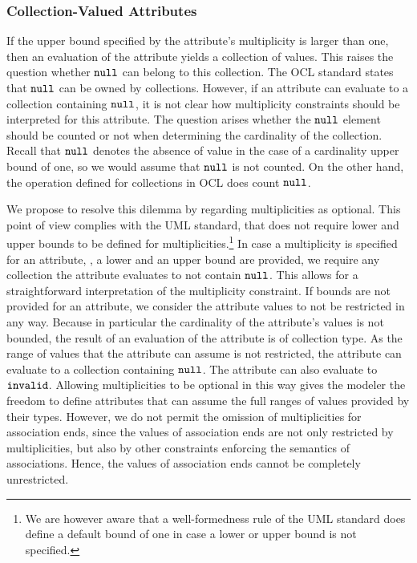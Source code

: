 \subsubsection{Collection-Valued Attributes}\label{sec:collection-valued-properties}
If the upper bound specified by the attribute's multiplicity is larger than one,
then an evaluation of the attribute yields a collection of values.  This raises
the question whether $\mathtt{null}$ can belong to this collection. The OCL
standard states that $\mathtt{null}$ can be owned by collections. However, if
an attribute can evaluate to a collection containing $\mathtt{null}$, it is not
clear how multiplicity constraints should be interpreted for this attribute. The
question arises whether the $\mathtt{null}$ element should be counted or not
when determining the cardinality of the collection. Recall that $\mathtt{null}$
denotes the absence of value in the case of a cardinality upper bound of one, so
we would assume that $\mathtt{null}$ is not counted. On the other hand, the
operation  defined for collections in OCL does count
$\mathtt{null}$.

We propose to resolve this dilemma by regarding multiplicities as optional. This
point of view complies with the UML standard, that does not require lower and
upper bounds to be defined for multiplicities.\footnote{We are however aware
  that a well-formedness rule of the UML standard does define a default bound
  of one in case a lower or upper bound is not specified.} In case a
multiplicity is specified for an attribute, \ie, a lower and an upper bound
are provided, we require any collection the attribute evaluates to not
contain $\mathtt{null}$. This allows for a straightforward interpretation of
the multiplicity constraint. If bounds are not provided for an attribute, we
consider the attribute values to not be restricted in any way. Because in
particular the cardinality of the attribute's values is not bounded, the result
of an evaluation of the attribute is of collection type. As the range of values
that the attribute can assume is not restricted, the attribute can evaluate to a
collection containing $\mathtt{null}$. The attribute can also evaluate to
$\mathtt{invalid}$. Allowing multiplicities to be optional in this way gives
the modeler the freedom to define attributes that can assume the full ranges of
values provided by their types. However, we do not permit the omission of
multiplicities for association ends, since the values of association ends are
not only restricted by multiplicities, but also by other constraints enforcing
the semantics of associations. Hence, the values of association ends cannot be
completely unrestricted.

